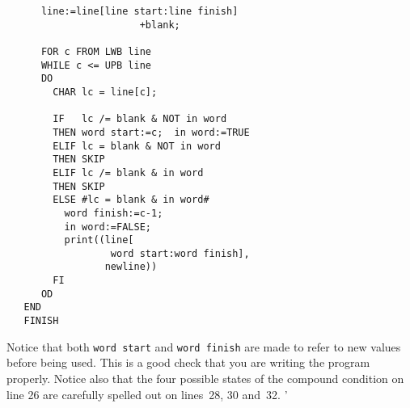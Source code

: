 \begin{exercise}
\begin{verbatim}
      line:=line[line start:line finish]
                       +blank;

      FOR c FROM LWB line
      WHILE c <= UPB line
      DO
        CHAR lc = line[c];

        IF   lc /= blank & NOT in word
        THEN word start:=c;  in word:=TRUE
        ELIF lc = blank & NOT in word
        THEN SKIP
        ELIF lc /= blank & in word
        THEN SKIP
        ELSE #lc = blank & in word#
          word finish:=c-1;
          in word:=FALSE;
          print((line[
                  word start:word finish],
                 newline))
        FI
      OD
   END
   FINISH
\end{verbatim}
\indent Notice that both \verb|word start| and \verb|word finish| are
made to refer to new values before being used. This is a good check
that you are writing the program properly. Notice also that the four
possible states of the compound condition on line 26 are carefully
spelled out on lines~28, 30 and~32.
'
\end{exercise}
